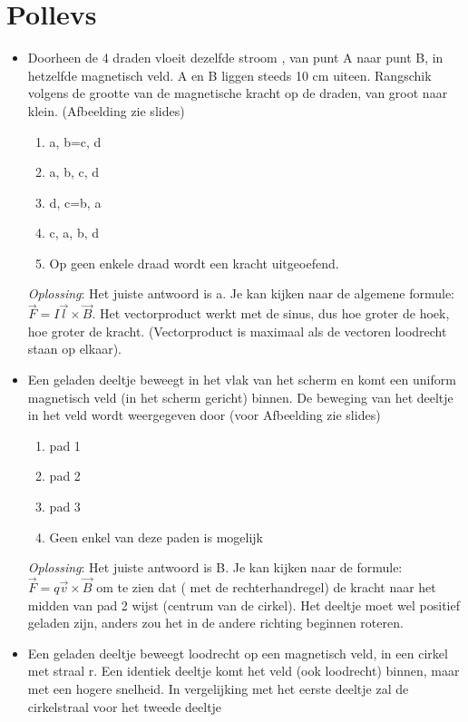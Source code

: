 \documentclass[12pt,a4paper]{article}
\begin{document}
    \section{Pollevs}
    \begin{itemize}
    	\renewcommand\labelitemi{--}
    	\item Doorheen de 4 draden vloeit dezelfde stroom , van punt A naar punt B, in hetzelfde magnetisch veld. A en B liggen steeds 10 cm uiteen. Rangschik volgens de grootte van de magnetische kracht op de draden, van groot naar klein. (Afbeelding zie slides)
    	\begin{enumerate}[label=\alph*]
    		\item a, b=c, d
    		\item a, b, c, d
    		\item d, c=b, a
    		\item c, a, b, d
    		\item Op geen enkele draad wordt een kracht uitgeoefend. 
    	\end{enumerate}
    	\textit{Oplossing}: Het juiste antwoord is a. Je kan kijken naar de algemene formule: \(\vec{F} = I\vec{l}\times\vec{B}\). Het vectorproduct werkt met de sinus, dus hoe groter de hoek, hoe groter de kracht. (Vectorproduct is maximaal als de vectoren loodrecht staan op elkaar). 
    	\item Een geladen deeltje beweegt in het vlak van het scherm en komt een uniform magnetisch veld (in het scherm gericht) binnen. De beweging van het deeltje in het veld wordt weergegeven door (voor Afbeelding zie slides)
    	\begin{enumerate}[label=\alph*]
    		\item pad 1
    		\item pad 2
    		\item pad 3
    		\item Geen enkel van deze paden is mogelijk
    	\end{enumerate}
    	\textit{Oplossing}: Het juiste antwoord is B. Je kan kijken naar de formule: \(\vec{F} = q\vec{v}\times\vec{B}\) om te zien dat ( met de rechterhandregel) de kracht naar het midden van pad 2 wijst (centrum van de cirkel). Het deeltje moet wel positief geladen zijn, anders zou het in de andere richting beginnen roteren. 
    	\item Een geladen deeltje beweegt loodrecht op een magnetisch veld, in een cirkel met straal r. Een identiek deeltje komt het veld (ook loodrecht) binnen, maar met een hogere snelheid. In vergelijking met het eerste deeltje zal de cirkelstraal voor het tweede deeltje

\end{itemize}
\end{document}
